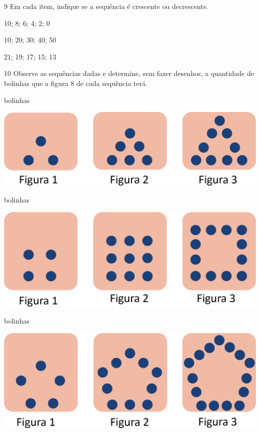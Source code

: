 \num{9} Em cada item, indique se a sequência é crescente ou decrescente.

\begin{escolha}
\item 10; 8; 6; 4; 2; 0

\item 10; 20; 30; 40; 50

\item 21; 19; 17; 15; 13

\end{escolha}

\num{10} Observe as sequências dadas e determine, sem fazer desenhos, a
quantidade de bolinhas que a figura 8 de cada sequência terá.

\begin{escolha}
\item {} bolinhas

\begin{center}
\includegraphics[width=.7\textwidth]{./media/image33.png}
\end{center}

\item {} bolinhas

\begin{center}
\includegraphics[width=.7\textwidth]{./media/image34.png}
\end{center}
\item {} bolinhas

\begin{center}
\includegraphics[width=.7\textwidth]{./media/image35.png}
\end{center}
\end{escolha}

